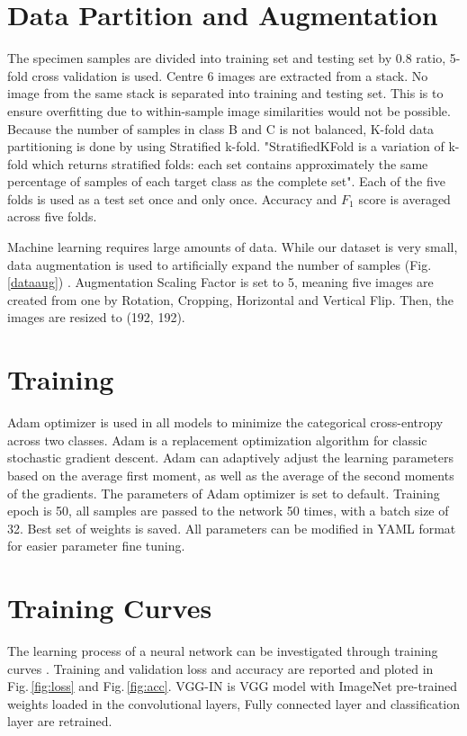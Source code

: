 \section{Data Partition and Augmentation}
The specimen samples are divided into training set and testing set by 0.8 ratio, 5-fold cross validation is used. Centre 6 images are extracted from a stack. No image from the same stack is separated into training and testing set. This is to ensure overfitting due to within-sample image similarities would not be possible. Because the number of samples in class B and C is not balanced, K-fold data partitioning is done by using Stratified k-fold. "StratifiedKFold is a variation of k-fold which returns stratified folds: each set contains approximately the same percentage of samples of each target class as the complete set". Each of the five folds is used as a test set once and only once. Accuracy and $F_1$ score is averaged across five folds.

Machine learning requires large amounts of data. While our dataset is very small, data augmentation is used to artificially expand the number of samples (Fig.\,\ref{dataaug}) . Augmentation Scaling Factor is set to 5, meaning five images are created from one by Rotation, Cropping, Horizontal and Vertical Flip. Then, the images are resized to (192, 192).

\section{Training}
Adam \citep{adam} optimizer is used in all models to minimize the categorical cross-entropy across two classes. Adam is a replacement optimization algorithm for classic stochastic gradient descent. Adam can adaptively adjust the learning parameters based on the average first moment, as well as the average of the second moments of the gradients. The parameters of Adam optimizer is set to default. Training epoch is 50, all samples are passed to the network 50 times, with a batch size of 32. Best set of weights is saved. All parameters can be modified in YAML format for easier parameter fine tuning.


\section{Training Curves}
The learning process of a neural network can be investigated through training curves \citep{Anzanello2011}. Training and validation loss and accuracy are reported and ploted in Fig.\,\ref{fig:loss} and Fig.\,\ref{fig:acc}. VGG-IN is VGG model with ImageNet pre-trained weights loaded in the convolutional layers, Fully connected layer and classification layer are retrained.


